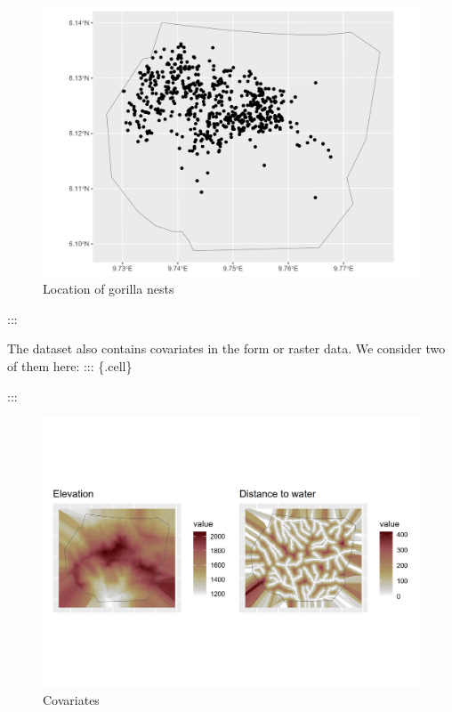 \documentclass[
  letterpaper,
  DIV=11,
  numbers=noendperiod]{scrartcl}
\newenvironment{Shaded}{\begin{snugshade}}{\end{snugshade}}
\newcommand{\FunctionTok}[1]{\textcolor[rgb]{0.28,0.35,0.67}{#1}}
\newcommand{\NormalTok}[1]{\textcolor[rgb]{0.00,0.23,0.31}{#1}}
\newcommand{\OtherTok}[1]{\textcolor[rgb]{0.00,0.23,0.31}{#1}}
\newcommand{\SpecialCharTok}[1]{\textcolor[rgb]{0.37,0.37,0.37}{#1}}
\begin{document}
\begin{figure}[H]

{\centering \includegraphics[width=0.8\linewidth,height=\textheight,keepaspectratio]{day5_practical_8_files/figure-pdf/nests_loc-1.png}

}

\caption{Location of gorilla nests}

\end{figure}%

:::

The dataset also contains covariates in the form or raster data. We
consider two of them here: ::: \{.cell\}

\begin{Shaded}
\end{Shaded}

:::

\begin{figure}[H]

{\centering \includegraphics[width=0.8\linewidth,height=\textheight,keepaspectratio]{day5_practical_8_files/figure-pdf/unnamed-chunk-64-1.png}

}

\caption{Covariates}

\end{figure}%
\end{document}
